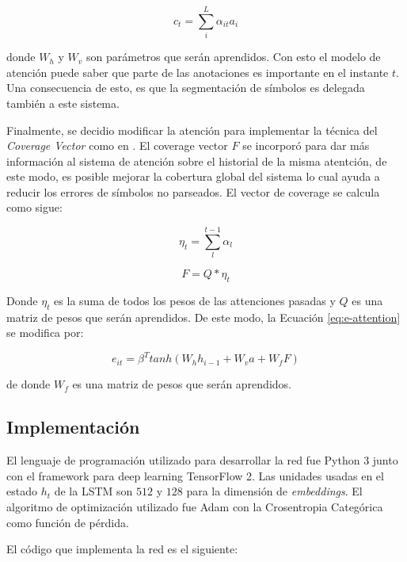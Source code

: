 \begin{equation}
    c_{t} = \sum_{i} ^ {L} \alpha_{it}a_{i}
\end{equation}

donde $W_{h}$ y $W_{v}$ son parámetros que serán aprendidos. Con esto el modelo de atención puede saber que parte de las anotaciones es importante en el instante $t$. Una consecuencia de esto, es que la segmentación de símbolos es delegada también a este sistema.

Finalmente, se decidio modificar la atención para implementar la técnica del \textit{Coverage Vector} como en \cite{chino}. El coverage vector $F$ se incorporó para dar más información al sistema de atención sobre el historial de la misma atentción, de este modo, es posible mejorar la cobertura global del sistema lo cual ayuda a reducir los errores de símbolos no parseados. El vector de coverage se calcula como sigue:

\begin{equation}
    \eta_{t} = \sum_{l}^{t-1} \alpha_{l}
\end{equation}

\begin{equation}
    F = Q * \eta_{t}
    \label{eq:coverage-vector}
\end{equation}

Donde $\eta_{t}$ es la suma de todos los pesos de las attenciones pasadas y $Q$ es una matriz de pesos que serán aprendidos. De este modo, la Ecuación \ref{eq:e-attention} se modifica por:

\begin{equation}
    e_{it} = \beta ^ {T} tanh(W_{h}h_{i-1} + W_{v}a + W_{f}F)
\end{equation}

de donde $W_{f}$ es una matriz de pesos que serán aprendidos.

\subsection{Implementación}

El lenguaje de programación utilizado para desarrollar la red fue Python 3 junto con el framework para deep learning TensorFlow 2. Las unidades usadas en el estado $h_{t}$ de la LSTM son $512$ y $128$ para la dimensión de \textit{embeddings}. El algoritmo de optimización utilizado fue Adam con la Crosentropia Categórica como función de pérdida. 

El código que implementa la red es el siguiente:

